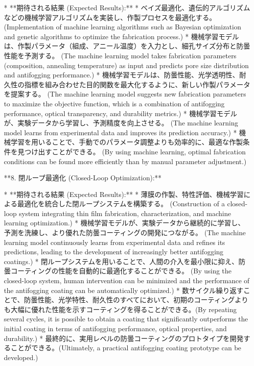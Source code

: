 \documentclass{article}
\begin{document}
*   **期待される結果 (Expected Results):**
    *   ベイズ最適化、遺伝的アルゴリズムなどの機械学習アルゴリズムを実装し、作製プロセスを最適化する。 (Implementation of machine learning algorithms such as Bayesian optimization and genetic algorithms to optimize the fabrication process.)
    *   機械学習モデルは、作製パラメータ（組成、アニール温度）を入力とし、細孔サイズ分布と防曇性能を予測する。 (The machine learning model takes fabrication parameters (composition, annealing temperature) as input and predicts pore size distribution and antifogging performance.)
    *   機械学習モデルは、防曇性能、光学透明性、耐久性の指標を組み合わせた目的関数を最大化するように、新しい作製パラメータを提案する。 (The machine learning model suggests new fabrication parameters to maximize the objective function, which is a combination of antifogging performance, optical transparency, and durability metrics.)
    *   機械学習モデルが、実験データから学習し、予測精度を向上させる。 (The machine learning model learns from experimental data and improves its prediction accuracy.)
    *   機械学習を用いることで、手動でのパラメータ調整よりも効率的に、最適な作製条件を見つけ出すことができる。 (By using machine learning, optimal fabrication conditions can be found more efficiently than by manual parameter adjustment.)

**8. 閉ループ最適化 (Closed-Loop Optimization):**

*   **期待される結果 (Expected Results):**
    *   薄膜の作製、特性評価、機械学習による最適化を統合した閉ループシステムを構築する。 (Construction of a closed-loop system integrating thin film fabrication, characterization, and machine learning optimization.)
    *   機械学習モデルが、実験データから継続的に学習し、予測を洗練し、より優れた防曇コーティングの開発につながる。 (The machine learning model continuously learns from experimental data and refines its predictions, leading to the development of increasingly better antifogging coatings.)
    *   閉ループシステムを用いることで、人間の介入を最小限に抑え、防曇コーティングの性能を自動的に最適化することができる。 (By using the closed-loop system, human intervention can be minimized and the performance of the antifogging coating can be automatically optimized.)
    *   数サイクル繰り返すことで、防曇性能、光学特性、耐久性のすべてにおいて、初期のコーティングよりも大幅に優れた性能を示すコーティングを得ることができる。(By repeating several cycles, it is possible to obtain a coating that significantly outperforms the initial coating in terms of antifogging performance, optical properties, and durability.)
    *   最終的に、実用レベルの防曇コーティングのプロトタイプを開発することができる。(Ultimately, a practical antifogging coating prototype can be developed.)
\end{document}
